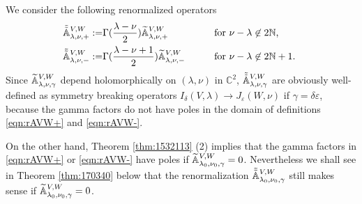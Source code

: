 We consider the following renormalized operators
\begin{alignat}{2}
\label{eqn:rAVW+}
  \tilde{\tilde{{\mathbb{A}}}}_{{\lambda},{\nu},{+}}^{{V,W}}:=&\Gamma(\frac{\lambda-\nu}{2}) {\widetilde{\mathbb{A}}}_{{\lambda},{\nu},{+}}^{{V,W}}
  \qquad
  &&\text{for $\nu-\lambda \not \in 2 {\mathbb{N}}$, }
\\
\label{eqn:rAVW-}
  \tilde{\tilde{{\mathbb{A}}}}_{{\lambda},{\nu},{-}}^{{V,W}}:=&\Gamma(\frac{\lambda-\nu+1}{2}) {\widetilde{\mathbb{A}}}_{{\lambda},{\nu},{-}}^{{V,W}}
  \qquad
  &&\text{for $\nu-\lambda \not \in 2 {\mathbb{N}}+1$.  }
\end{alignat}
Since ${\widetilde{\mathbb{A}}}_{{\lambda},{\nu},{\gamma}}^{{V,W}}$ depend holomorphically 
 on $(\lambda, \nu)$ in ${\mathbb{C}}^2$, 
 $\tilde{\tilde{{\mathbb{A}}}}_{{\lambda},{\nu},{\gamma}}^{{V,W}}$ are obviously well-defined 
 as symmetry breaking operators
 $I_{\delta}(V,\lambda)\to J_{\varepsilon}(W,\nu)$
 if $\gamma = \delta \varepsilon$, 
 because the gamma factors do not have poles
 in the domain of definitions \eqref{eqn:rAVW+} and \eqref{eqn:rAVW-}.  



On the other hand, 
 Theorem \ref{thm:1532113} (2) implies 
 that the gamma factors in \eqref{eqn:rAVW+} or \eqref{eqn:rAVW-}
 have poles 
 if ${\widetilde{\mathbb{A}}}_{{\lambda_0},{\nu_0},{\gamma}}^{{V,W}}=0$.  
Nevertheless we shall see in Theorem \ref{thm:170340} below
 that the renormalization $\tilde{\tilde{{\mathbb{A}}}}_{{\lambda_0},{\nu_0},{\gamma}}^{{V,W}}$
 still makes sense
 if ${\widetilde{\mathbb{A}}}_{{\lambda_0},{\nu_0},{\gamma}}^{{V,W}}=0$.  



